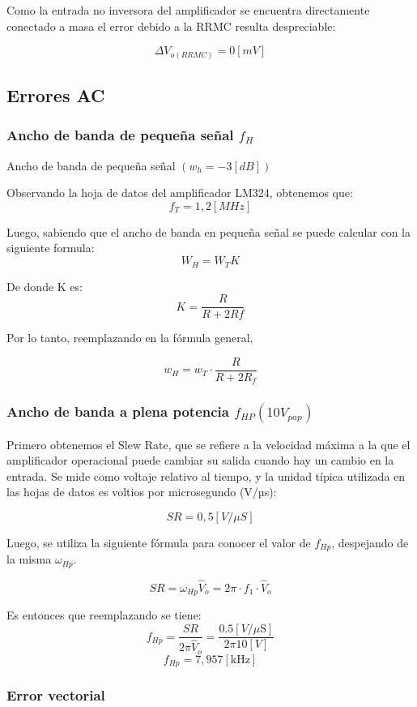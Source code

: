 Como la entrada no inversora del amplificador se encuentra directamente conectado a masa el error debido a la RRMC resulta despreciable:

\[ \Delta V_{o (RRMC) }=0 [ mV ]\]


\subsection{Errores AC}

\subsubsection{Ancho de banda de pequeña señal $f_H$}



Ancho de banda de pequeña señal $\left(w_{h}=-3[d B]\right)$

Observando la hoja de datos del amplificador LM324, obtenemos que:
\[f_T = 1,2 [MHz]\]
 

Luego, sabiendo que el ancho de banda en pequeña señal se puede calcular con la siguiente formula: 
\[ W_H = W_{T} K \]

De donde K es:
\[ K=\frac{R}{R+2 R f}\]

Por lo tanto, reemplazando en la fórmula general,

\[ w_H = w_{T} \cdot \frac{R}{R+2 R_f} \]


\subsubsection{Ancho de banda a plena potencia \(f_{HP} (10 V_{pap})\) } 


Primero obtenemos el Slew Rate, que se refiere a la velocidad máxima a la que el amplificador operacional puede cambiar su salida cuando hay un cambio en la entrada. Se mide como voltaje relativo al tiempo, y la unidad típica utilizada en las hojas de datos es voltios por microsegundo (V/µs):


 \[ S R=0,5[V / \mu S] \] 

Luego, se utiliza la siguiente fórmula para conocer el valor de $f_{Hp}$, despejando de la misma $\omega_{Hp}$.

\[ S R = \omega_{Hp} \hat{V}_{o} = 2 \pi \cdot  f_{1} \cdot  \hat{V}_{o} \]

Es entonces que reemplazando se tiene:
\[ f_{Hp} = \frac{S R}{2 \pi \hat{V}_{o}} = \frac{0.5[V/ \mu \mathrm{S}]}{2 \pi 10[V]} \]
\[ f_{Hp} = 7,957 [\mathrm{kHz}] \]

\subsubsection{Error vectorial }

